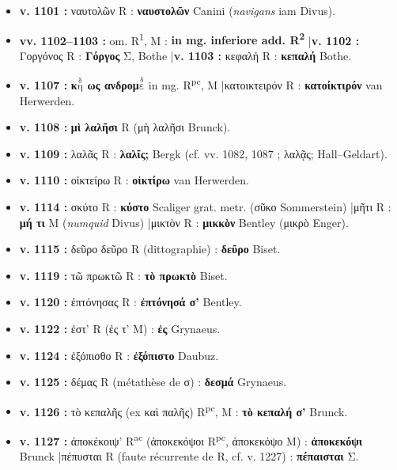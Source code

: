 \documentclass[10pt, a4paper, twoside]{book}
\renewcommand{\_}{\origunderscore\penalty0\relax}
\providecommand{\italique}[1]{\emph{#1}}
\providecommand{\lecon}[1]{\textbf{#1}}
\providecommand{\expo}[1]{\textsuperscript{#1}}
\providecommand{\Run}{R\expo{1}}
\providecommand{\Rac}{R\expo{ac}}
\providecommand{\Rpc}{R\expo{pc}}
\providecommand{\Rdeux}{R\expo{2}}
\providecommand{\Mon}{M}
\providecommand{\espApp}{\hspace{0.5em}|\hspace{0.5em}}
\providecommand{\auDessus}[2]{\ensuremath{\overset{\text{#2}}{\text{#1}}}}
\begin{document}
\begin{itemize}
\begin{itemize}
    \item \textbf{v. 1101 :} ναυτολῶν R : \lecon{ναυστολῶν} Canini (\italique{navigans} iam Divus).
    \item \textbf{vv. 1102–1103 :} om. \Run{}, \Mon{} : \textbf{in mg. inferiore add. \Rdeux{}} \espApp \textbf{v. 1102 :} Γοργόνος R : \lecon{Γόργος} Σ, Bothe \espApp \textbf{v. 1103 :} κεφαλή R : \lecon{κεπαλή} Bothe.
    \item \textbf{v. 1107 :} \lecon{κ\auDessus{η}{δ} ως ανδρομ\auDessus{ε}{δ}} in mg. \Rpc{}, \Mon{} \espApp κατοικτειρόν R : \lecon{κατοίκτιρόν} van Herwerden.
    \item \textbf{v. 1108 :} \lecon{μὶ λαλῆσι} R (μὴ λαλῆσι Brunck).
    \item \textbf{v. 1109 :} λαλᾶς R : \lecon{λαλῖς;} Bergk (cf. vv. 1082, 1087 ; λαλᾷς; Hall–Geldart).
    \item \textbf{v. 1110 :} οἰκτείρω R : \lecon{οἰκτίρω} van Herwerden.
    \item \textbf{v. 1114 :} σκύτο R : \lecon{κύστο} Scaliger grat. metr. (σῦκο Sommerstein) \espApp μῆτι R : \lecon{μή τι} \Mon{} (\italique{numquid} Divus) \espApp μικτὸν R : \lecon{μικκὸν} Bentley (μικρὸ Enger).
    \item \textbf{v. 1115 :} δεῦρο δεῦρο R (dittographie) : \lecon{δεῦρο} Biset.
    \item \textbf{v. 1119 :} τῶ πρωκτῶ R : \lecon{τὸ πρωκτὸ} Biset.
    \item \textbf{v. 1120 :} ἐπτόνησας R : \lecon{ἐπτόνησά σ'} Bentley.
    \item \textbf{v. 1122 :} ἐστ' R (ἐς τ' \Mon{}) : \lecon{ἐς} Grynaeus.
    \item \textbf{v. 1124 :} ἐξόπισθο R : \lecon{ἐξόπιστο} Daubuz.
    \item \textbf{v. 1125 :} δέμας R (métathèse de σ) : \lecon{δεσμά} Grynaeus.
    \item \textbf{v. 1126 :} τὸ κεπαλῆς (ex καὶ παλῆς) \Rpc{}, \Mon{} : \lecon{τὸ κεπαλή σ'} Brunck.
    \item \textbf{v. 1127 :} ἀποκέκοιψ' \Rac{} (ἀποκεκόψοι \Rpc{}, ἀποκεκόψο \Mon{}) : \lecon{ἀποκεκόψι} Brunck \espApp πέπυσται R (faute récurrente de R, cf. v. 1227) : \lecon{πέπαισται} Σ.
  \end{itemize}
\end{itemize}
\end{document}
